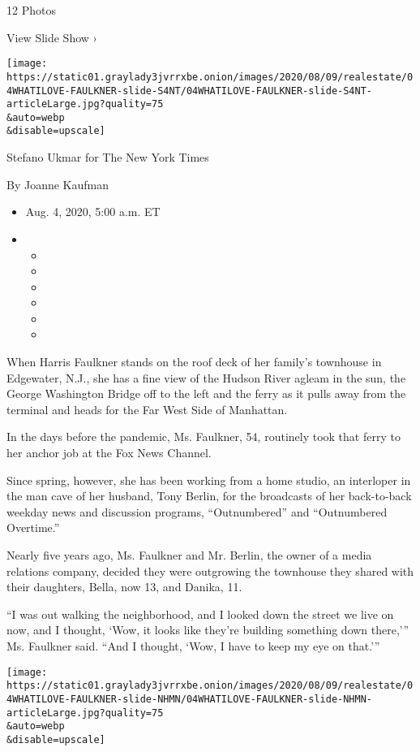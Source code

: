 12 Photos

View Slide Show ›

\texttt{[image: https://static01.graylady3jvrrxbe.onion/images/2020/08/09/realestate/04WHATILOVE-FAULKNER-slide-S4NT/04WHATILOVE-FAULKNER-slide-S4NT-articleLarge.jpg?quality=75\\\&auto=webp\\\&disable=upscale]}

Stefano Ukmar for The New York Times

By Joanne Kaufman

\begin{itemize}
\item
  Aug. 4, 2020, 5:00 a.m. ET
\item
  \begin{itemize}
  \item
  \item
  \item
  \item
  \item
  \item
  \end{itemize}
\end{itemize}

When Harris Faulkner stands on the roof deck of her family's townhouse
in Edgewater, N.J., she has a fine view of the Hudson River agleam in
the sun, the George Washington Bridge off to the left and the ferry as
it pulls away from the terminal and heads for the Far West Side of
Manhattan.

In the days before the pandemic, Ms. Faulkner, 54, routinely took that
ferry to her anchor job at the Fox News Channel.

Since spring, however, she has been working from a home studio, an
interloper in the man cave of her husband, Tony Berlin, for the
broadcasts of her back-to-back weekday news and discussion programs,
``Outnumbered'' and ``Outnumbered Overtime.''

Nearly five years ago, Ms. Faulkner and Mr. Berlin, the owner of a media
relations company, decided they were outgrowing the townhouse they
shared with their daughters, Bella, now 13, and Danika, 11.

``I was out walking the neighborhood, and I looked down the street we
live on now, and I thought, `Wow, it looks like they're building
something down there,''' Ms. Faulkner said. ``And I thought, `Wow, I
have to keep my eye on that.'''

\texttt{[image: https://static01.graylady3jvrrxbe.onion/images/2020/08/09/realestate/04WHATILOVE-FAULKNER-slide-NHMN/04WHATILOVE-FAULKNER-slide-NHMN-articleLarge.jpg?quality=75\\\&auto=webp\\\&disable=upscale]}

